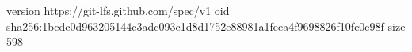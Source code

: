 version https://git-lfs.github.com/spec/v1
oid sha256:1bcdc0d963205144c3adc093c1d8d1752e88981a1feea4f9698826f10fe0e98f
size 598
